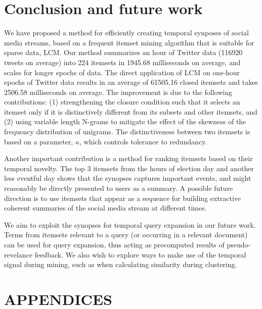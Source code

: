 \documentclass[letterpaper,12pt,titlepage,oneside,final]{book}
\begin{document}
 

\chapter{Conclusion and future work}
\label{sec:concfut}
We have proposed a method for efficiently creating temporal synposes of social
media streams, based on a frequent itemset mining algorithm that is suitable
for sparse data, LCM.
Our method summarizes an hour of Twitter data (116920 tweets on average) into
224 itemsets in 1945.68 milliseconds on average,
and scales for longer epochs of data.
The direct application of LCM on one-hour epochs of Twitter data results in
an average of 61505.16 closed itemsets and takes 2506.58 milliseconds on
average.
The improvement is due to the following contributions: 
(1) strengthening  the closure condition such that it selects an itemset only if
it is distinctively different from its subsets and other itemsets, and 
(2) using variable length N-grams to mitigate the effect
of the skewness of the frequency distribution of unigrams.
The distinctiveness between two itemsets is based on a parameter, $\kappa$, which controls tolerance to redundancy. %

Another important contribution is a method for ranking itemsets based on their temporal novelty.
The top 3 itemsets from the hours of election day and another less eventful
day shows that the synopses captures important events, and might reasonably
be directly presented to users as a summary.
A possible future direction is to use itemsets that appear as a sequence for
building extractive coherent summaries of the social media stream at
different times.

We aim to exploit the synopses for temporal query expansion in our future work. Terms from itemsets relevant to a query (or occurring in a relevant document)
can be used for query expansion, thus acting as precomputed results of 
pseudo-revelance feedback.
We also wish to explore ways to make use of the temporal signal during mining,
such as when calculating similarity during clustering.

 
\appendix

\chapter*{APPENDICES}
\end{document}
